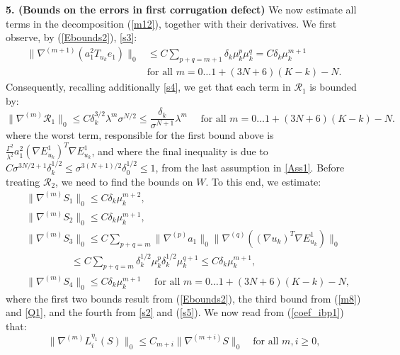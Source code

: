 \documentclass[reqno,twoside,11pt]{amsart}
\numberwithin{equation}{section}
\theoremstyle{plain}
\theoremstyle{definition}
\begin{document}
{\bf 5. (Bounds on the errors in first corrugation defect)}
We now estimate all terms in the decomposition (\ref{m12}), together with their derivatives.
We first observe, by (\ref{Ebounds2}), \ref{s3}:
\begin{equation}\label{s5}
\begin{split}
\|\nabla^{(m+1)}(a_1^2T_{u_k}e_1)\|_0 &\leq
C\sum_{p+q=m+1}\delta_k\mu_k^p\mu_k^q=C\delta_k\mu_k^{m+1} \\ & \mbox{for all } 
m=0\ldots 1+(3N+6)(K-k)-N.
\end{split}
\end{equation}
Consequently, recalling additionally
\ref{s4}, we get that each term in $\mathcal{R}_1$ is bounded by:
\begin{equation}\label{m13}
\|\nabla^{(m)}\mathcal{R}_1\|_0\leq C\delta_k^{3/2}\lambda^m\sigma^{N/2}\leq
\frac{\delta_k}{\sigma^{N+1}}\lambda^m\quad \mbox{ for all } m=0\ldots 1+(3N+6)(K-k)-N.
\end{equation}
where the worst term, responsible for the first bound above is
$\frac{\Gamma^2}{\lambda^2}a_1^2(\nabla E^1_{u_k})^T \nabla
E^1_{u_k}$, and where the final inequality is due to 
$C\sigma^{3N/2+1}\delta_k^{1/2}\leq \sigma^{3(N+1)/2}\delta_0^{1/2} \leq 1$, 
from the last assumption in \ref{Ass1}.
Before treating $\mathcal{R}_2$, we need to find the bounds on $W$. To
this end, we estimate:
\begin{equation}\label{SUbound}
\begin{split}
& \|\nabla^{(m)}S_1\|_0\leq C\delta_k\mu_k^{m+2}, \\
& \|\nabla^{(m)}S_2\|_0\leq C\delta_k\mu_k^{m+1}, \\
& \|\nabla^{(m)}S_3\|_0\leq C\sum_{p+q=m}\|\nabla^{(p)}a_1\|_0\|\nabla^{(q)}((\nabla u_k)^T\nabla
E_{u_k}^1)\|_0\\ & \qquad \qquad\;\; \leq
C\sum_{p+q=m}\delta_k^{1/2}\mu_k^p\delta_k^{1/2}\mu_k^{q+1}
\leq C\delta_k\mu_k^{m+1}, \\
& \|\nabla^{(m)}S_4\|_0\leq C\delta_k\mu_k^{m+1} \quad\mbox{ for all } m=0\ldots 1+(3N+6)(K-k)-N,
\end{split}
\end{equation}
where the first two bounds result from (\ref{Ebounds2}), the third bound
from (\ref{m8}) and \ref{Q1}, and the fourth from \ref{s2} and
(\ref{s5}). We now read from (\ref{coef_ibp1}) that:
\begin{equation}\label{m16}
\|\nabla^{(m)}L_i^{\eta_1}(S)\|_0\leq
C_{m+i}\|\nabla^{(m+i)}S\|_0\quad\mbox{for all } m,i\geq 0,
\end{equation}
\end{document}
